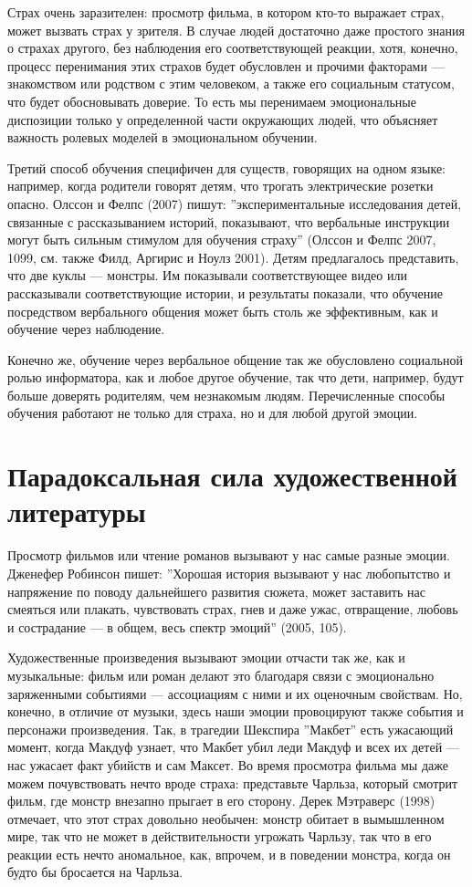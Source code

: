 \documentclass[11pt]{book}
\begin{document}
Страх очень заразителен: просмотр фильма, в котором кто-то выражает страх, может вызвать страх у зрителя. В случае людей достаточно даже простого знания о страхах другого, без наблюдения его соответствующей реакции, хотя, конечно, процесс перенимания этих страхов будет обусловлен и прочими факторами --- знакомством или родством с этим человеком, а также его социальным статусом, что будет обосновывать доверие. То есть мы перенимаем эмоциональные диспозиции только у определенной части окружающих людей, что объясняет важность ролевых моделей в эмоциональном обучении.

Третий способ обучения специфичен для существ, говорящих на одном языке: например, когда родители говорят детям, что трогать электрические розетки опасно. Олссон и Фелпс (2007) пишут: ''экспериментальные исследования детей, связанные с рассказыванием историй, показывают, что вербальные инструкции могут быть сильным стимулом для обучения страху'' (Олссон и Фелпс 2007, 1099, см. также Филд, Аргирис и Ноулз 2001). Детям предлагалось представить, что две куклы --- монстры. Им показывали соответствующее видео или рассказывали соответствующие истории, и результаты показали, что обучение посредством вербального общения может быть столь же эффективным, как и обучение через наблюдение.

Конечно же, обучение через вербальное общение так же обусловлено социальной ролью информатора, как и любое другое обучение, так что дети, например, будут больше доверять родителям, чем незнакомым людям. Перечисленные способы обучения работают не только для страха, но и для любой другой эмоции.

\section{Парадоксальная сила художественной литературы}

Просмотр фильмов или чтение романов вызывают у нас самые разные эмоции. Дженефер Робинсон пишет: ''Хорошая история вызывают у нас любопытство и напряжение по поводу дальнейшего развития сюжета, может заставить нас смеяться или плакать, чувствовать страх, гнев и даже ужас, отвращение, любовь и сострадание --- в общем, весь спектр эмоций'' (2005, 105).

Художественные произведения вызывают эмоции отчасти так же, как и музыкальные: фильм или роман делают это благодаря связи с эмоционально заряженными событиями --- ассоциациям с ними и их оценочным свойствам. Но, конечно, в отличие от музыки, здесь наши эмоции провоцируют также события и персонажи произведения. Так, в трагедии Шекспира ''Макбет'' есть ужасающий момент, когда Макдуф узнает, что Макбет убил леди Макдуф и всех их детей --- нас ужасает факт убийств и сам Максет. Во время просмотра фильма мы даже можем почувствовать нечто вроде страха: представьте Чарльза, который смотрит фильм, где монстр внезапно прыгает в его сторону. Дерек Мэтраверс (1998) отмечает, что этот страх довольно необычен: монстр обитает в вымышленном мире, так что не может в действительности угрожать Чарльзу, так что в его реакции есть нечто аномальное, как, впрочем, и в поведении монстра, когда он будто бы бросается на Чарльза.
\end{document}
